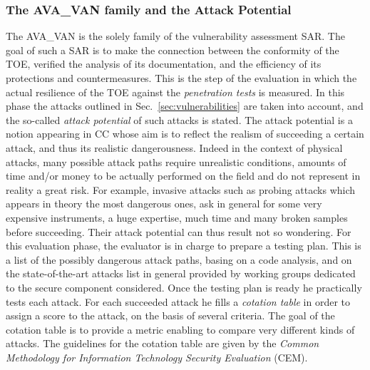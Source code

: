 \subsubsection{The AVA\_VAN family and the Attack Potential}
The AVA\_VAN is the solely family of the vulnerability assessment SAR. The goal of such a SAR is to make the connection between the conformity of the TOE, verified \via the analysis of its documentation, and the efficiency of its protections and countermeasures. This is the step of the evaluation in which the actual resilience of the TOE against the \emph{penetration tests} is measured. In this phase the attacks outlined in Sec.~\ref{sec:vulnerabilities} are taken into account, and the so-called \emph{attack potential} of such attacks is stated. The attack potential is a notion appearing in CC whose aim is to reflect the realism of succeeding a certain attack, and thus its realistic dangerousness. Indeed in the context of physical attacks, many possible attack paths require unrealistic conditions, amounts of time and/or money to be actually performed on the field and do not represent in reality a great risk. For example, invasive attacks such as probing attacks which appears in theory the most dangerous ones, ask in general for some very expensive instruments, a huge expertise, much time and many broken samples before succeeding. Their attack potential can thus result not so wondering. For this evaluation phase, the evaluator is in charge to prepare a testing plan. This is a list of the possibly dangerous attack paths, basing on a code analysis, and on the state-of-the-art attacks list in general provided by working groups dedicated to the secure component considered. Once the testing plan is ready he practically tests each attack. For each succeeded attack he fills a \emph{cotation table} in order to assign a score to the attack, on the basis of several criteria. The goal of the cotation table is to provide a metric enabling to compare very different kinds of attacks. The guidelines for the cotation table are given by the \emph{Common Methodology for Information Technology Security Evaluation} (CEM). \\

